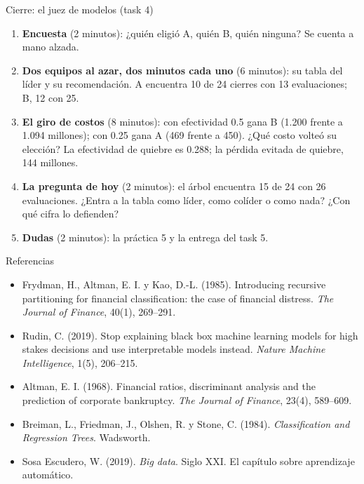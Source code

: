 \documentclass{beamer}
\begin{document}
\begin{frame}{Cierre: el juez de modelos (task 4)}
\begin{enumerate}\itemsep6pt
  \item \textbf{Encuesta} (2 minutos): ¿quién eligió A, quién B, quién ninguna? Se cuenta a mano alzada.
  \item \textbf{Dos equipos al azar, dos minutos cada uno} (6 minutos): su tabla del líder y su recomendación. A encuentra 10 de 24 cierres con 13 evaluaciones; B, 12 con 25.
  \item \textbf{El giro de costos} (8 minutos): con efectividad 0.5 gana B (1.200 frente a 1.094 millones); con 0.25 gana A (469 frente a 450). ¿Qué costo volteó su elección? La efectividad de quiebre es 0.288; la pérdida evitada de quiebre, 144 millones.
  \item \textbf{La pregunta de hoy} (2 minutos): el árbol encuentra 15 de 24 con 26 evaluaciones. ¿Entra a la tabla como líder, como colíder o como nada? ¿Con qué cifra lo defienden?
  \item \textbf{Dudas} (2 minutos): la práctica 5 y la entrega del task 5.
\end{enumerate}
\end{frame}

\begin{frame}{Referencias}
\small
\begin{itemize}\itemsep4pt
  \item Frydman, H., Altman, E. I. y Kao, D.-L. (1985). Introducing recursive partitioning for financial classification: the case of financial distress. \emph{The Journal of Finance}, 40(1), 269--291.
  \item Rudin, C. (2019). Stop explaining black box machine learning models for high stakes decisions and use interpretable models instead. \emph{Nature Machine Intelligence}, 1(5), 206--215.
  \item Altman, E. I. (1968). Financial ratios, discriminant analysis and the prediction of corporate bankruptcy. \emph{The Journal of Finance}, 23(4), 589--609.
  \item Breiman, L., Friedman, J., Olshen, R. y Stone, C. (1984). \emph{Classification and Regression Trees}. Wadsworth.
  \item Sosa Escudero, W. (2019). \emph{Big data}. Siglo XXI. El capítulo sobre aprendizaje automático.
\end{itemize}
\end{frame}
\end{document}
